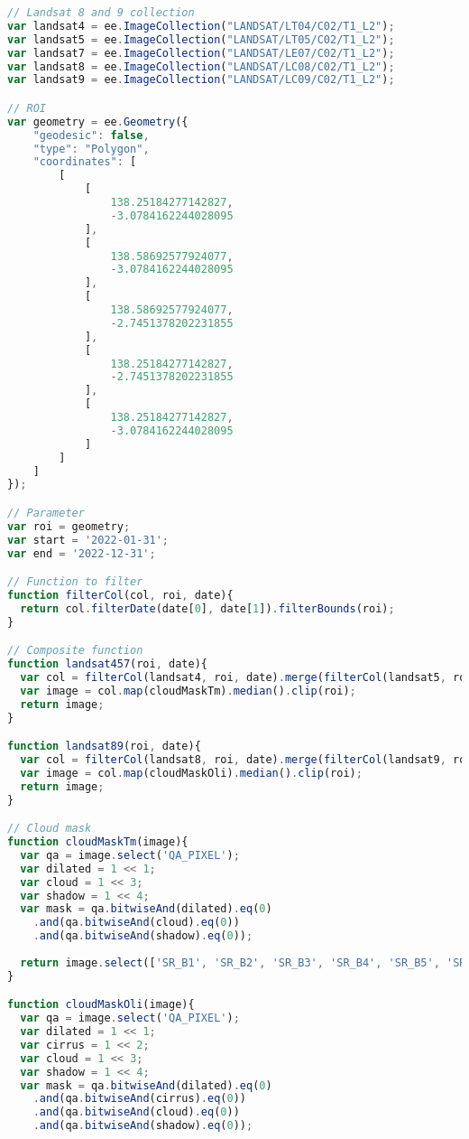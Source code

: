 \begin{lstlisting}[language=JavaScript, label={code:riverChange}, caption={GEE script to model river change}]
// Landsat 8 and 9 collection
var landsat4 = ee.ImageCollection("LANDSAT/LT04/C02/T1_L2");
var landsat5 = ee.ImageCollection("LANDSAT/LT05/C02/T1_L2");
var landsat7 = ee.ImageCollection("LANDSAT/LE07/C02/T1_L2");
var landsat8 = ee.ImageCollection("LANDSAT/LC08/C02/T1_L2");
var landsat9 = ee.ImageCollection("LANDSAT/LC09/C02/T1_L2");

// ROI
var geometry = ee.Geometry({
	"geodesic": false,
	"type": "Polygon",
	"coordinates": [
		[
			[
				138.25184277142827,
				-3.0784162244028095
			],
			[
				138.58692577924077,
				-3.0784162244028095
			],
			[
				138.58692577924077,
				-2.7451378202231855
			],
			[
				138.25184277142827,
				-2.7451378202231855
			],
			[
				138.25184277142827,
				-3.0784162244028095
			]
		]
	]
});

// Parameter
var roi = geometry;
var start = '2022-01-31';
var end = '2022-12-31';

// Function to filter
function filterCol(col, roi, date){
  return col.filterDate(date[0], date[1]).filterBounds(roi);
}

// Composite function
function landsat457(roi, date){
  var col = filterCol(landsat4, roi, date).merge(filterCol(landsat5, roi, date)).merge(filterCol(landsat7, roi, date));
  var image = col.map(cloudMaskTm).median().clip(roi);
  return image;
}

function landsat89(roi, date){
  var col = filterCol(landsat8, roi, date).merge(filterCol(landsat9, roi, date));
  var image = col.map(cloudMaskOli).median().clip(roi);
  return image;
}

// Cloud mask
function cloudMaskTm(image){
  var qa = image.select('QA_PIXEL');
  var dilated = 1 << 1;
  var cloud = 1 << 3;
  var shadow = 1 << 4;
  var mask = qa.bitwiseAnd(dilated).eq(0)
    .and(qa.bitwiseAnd(cloud).eq(0))
    .and(qa.bitwiseAnd(shadow).eq(0));
  
  return image.select(['SR_B1', 'SR_B2', 'SR_B3', 'SR_B4', 'SR_B5', 'SR_B7'], ['B2', 'B3', 'B4', 'B5', 'B6', 'B7']).updateMask(mask);
}

function cloudMaskOli(image){
  var qa = image.select('QA_PIXEL');
  var dilated = 1 << 1;
  var cirrus = 1 << 2;
  var cloud = 1 << 3;
  var shadow = 1 << 4;
  var mask = qa.bitwiseAnd(dilated).eq(0)
    .and(qa.bitwiseAnd(cirrus).eq(0))
    .and(qa.bitwiseAnd(cloud).eq(0))
    .and(qa.bitwiseAnd(shadow).eq(0));
  

\end{lstlisting}
